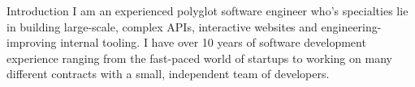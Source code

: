 \documentclass{bluefin_cv}
\begin{document}
\makeheader

\begin{bfcvSection}{Introduction}
I am an experienced polyglot software engineer who’s specialties lie in building large-scale, complex APIs, interactive websites and engineering-improving internal tooling. I have over 10 years of software development experience ranging from the fast-paced world of startups to working on many different contracts with a small, independent team of developers.
\end{bfcvSection}
\end{document}
